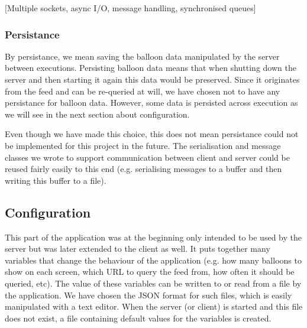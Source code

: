[Multiple sockets, async I/O, message handling, synchronised queues]

\subsubsection{Persistance}

By persistance, we mean saving the balloon data manipulated by the server between 
executions. Persisting balloon data means that when shutting down the 
server and then starting it again this data would be preserved. Since it 
originates from the feed and can be re-queried at will, we have chosen not to
have any persistance for balloon data. However, some data is persisted across 
execution as we will see in the next section about configuration.

Even though we have made this choice, this does not mean persistance could not 
be implemented for this project in the future. The serialisation and message 
classes we wrote to support communication between client and server could be 
reused fairly easily to this end (e.g. serialising messages to a buffer and 
then writing this buffer to a file).

\subsection{Configuration}

This part of the application was at the beginning only intended to be used by 
the server but was later extended to the client as well. It puts together many 
variables that change the behaviour of the application (e.g. how many balloons 
to show on each screen, which URL to query the feed from, how often it  
should be queried, etc). The value of these variables can be written to or read 
from a file by the application. We have chosen the JSON format for such files, 
which is easily manipulated with a text editor. When the server (or client) is 
started and this file does not exist, a file containing default values for the 
variables is created.

